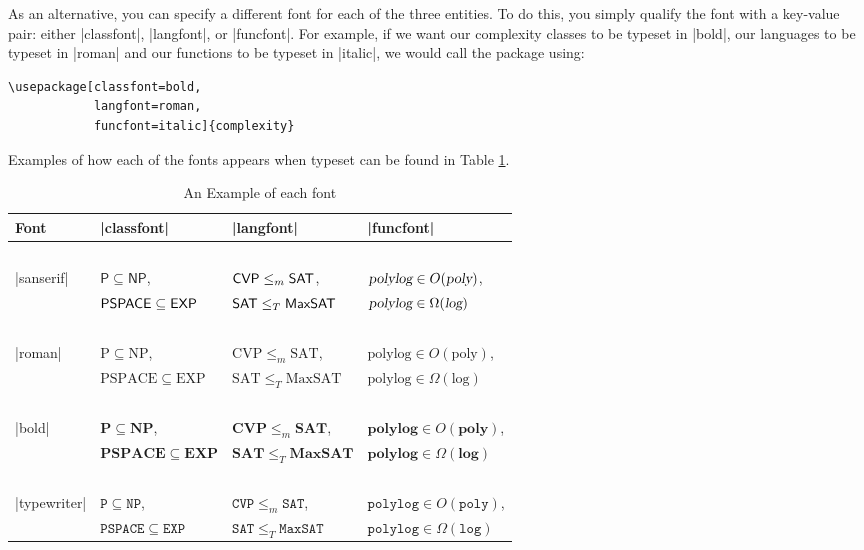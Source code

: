 \documentclass{ltxdoc}
\begin{document}
As an alternative, you can specify a different font for each of the
three entities.  To do this, you simply qualify the font with a
key-value pair: either |classfont|, |langfont|, or |funcfont|.  For
example, if we want our complexity classes to be typeset in |bold|,
our languages to be typeset in |roman| and our functions to be
typeset in |italic|, we would call the package using:

\begin{verbatim}
\usepackage[classfont=bold,
            langfont=roman,
            funcfont=italic]{complexity}
\end{verbatim}

Examples of how each of the fonts appears when typeset can be found
in Table \ref{table:Examples}.

\begin{table}[h]
  \centering
  \caption{An Example of each font}\label{table:Examples}
\begin{tabular}{lp{3cm}p{4cm}p{3.5cm}}
Font & |classfont| & |langfont| & |funcfont| \\
\hline %
\hline %
~\\
|sanserif| & $\mathsf{P} \subseteq \mathsf{NP}$, & ${\mathsf{CVP}} \leq_m {\mathsf{SAT}}$, & ${\textsl{polylog}} \in O({\textsl{poly}})$,\\
~ & ${\mathsf{PSPACE}} \subseteq {\ensuremath{\mathsf{EXP}}}$ & ${\mathsf{SAT}} \leq_T {\mathsf{MaxSAT}}$ & ${\textsl{polylog}} \in \Omega({\textsl{log}})$ \\
~\\
|roman| & $\mathrm{P} \subseteq \mathrm{NP}$, & $\mathrm{CVP} \leq_m \mathrm{SAT}$, & $\mathrm{polylog} \in O(\mathrm{poly})$,\\
~ & $\mathrm{PSPACE} \subseteq \mathrm{EXP}$ & $\mathrm{SAT} \leq_T \mathrm{MaxSAT}$ & $\mathrm{polylog} \in \Omega(\mathrm{log})$ \\
~\\
|bold| & $\mathbf{P} \subseteq \mathbf{NP}$, & $\mathbf{CVP} \leq_m \mathbf{SAT}$, & $\mathbf{polylog} \in O(\mathbf{poly})$,\\
~ & $\mathbf{PSPACE} \subseteq \mathbf{EXP}$ & $\mathbf{SAT} \leq_T \mathbf{MaxSAT}$ & $\mathbf{polylog} \in \Omega(\mathbf{log})$ \\
~\\
|typewriter| & $\mathtt{P} \subseteq \mathtt{NP}$, & $\mathtt{CVP} \leq_m \mathtt{SAT}$, & $\mathtt{polylog} \in O(\mathtt{poly})$,\\
~ & $\mathtt{PSPACE} \subseteq \mathtt{EXP}$ & $\mathtt{SAT} \leq_T \mathtt{MaxSAT}$ & $\mathtt{polylog} \in \Omega(\mathtt{log})$ \\

\end{tabular}
\end{table}
\end{document}
